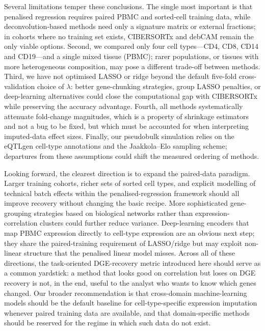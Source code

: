 \documentclass[11pt]{article}
\begin{document}
Several limitations temper these conclusions. The single most
important is that penalised regression requires paired PBMC and
sorted-cell training data, while deconvolution-based methods need only
a signature matrix or external fractions; in cohorts where no training
set exists, CIBERSORTx and debCAM remain the only viable options.
Second, we compared only four cell types---CD4, CD8, CD14 and
CD19---and a single mixed tissue (PBMC); rarer populations, or tissues
with more heterogeneous composition, may pose a different trade-off
between methods. Third, we have not optimised LASSO or ridge beyond
the default five-fold cross-validation choice of $\lambda$: better
gene-chunking strategies, group LASSO penalties, or deep-learning
alternatives could close the computational gap with CIBERSORTx while
preserving the accuracy advantage. Fourth, all methods systematically
attenuate fold-change magnitudes, which is a property of shrinkage
estimators and not a bug to be fixed, but which must be accounted for
when interpreting imputed-data effect sizes. Finally, our pseudobulk
simulation relies on the eQTLgen cell-type annotations and the
Jaakkola--Elo sampling scheme; departures from these assumptions could
shift the measured ordering of methods.

Looking forward, the clearest direction is to expand the paired-data
paradigm. Larger training cohorts, richer sets of sorted cell types,
and explicit modelling of technical batch effects within the
penalised-regression framework should all improve recovery without
changing the basic recipe. More sophisticated gene-grouping strategies
based on biological networks rather than expression-correlation
clusters could further reduce variance. Deep-learning encoders that
map PBMC expression directly to cell-type expression are an obvious
next step; they share the paired-training requirement of LASSO/ridge
but may exploit non-linear structure that the penalised linear model
misses. Across all of these directions, the task-oriented
DGE-recovery metric introduced here should serve as a common
yardstick: a method that looks good on correlation but loses on DGE
recovery is not, in the end, useful to the analyst who wants to know
which genes changed. Our broader recommendation is that cross-domain
machine-learning models should be the default baseline for
cell-type-specific expression imputation whenever paired training data
are available, and that domain-specific methods should be reserved
for the regime in which such data do not exist.



\end{document}
